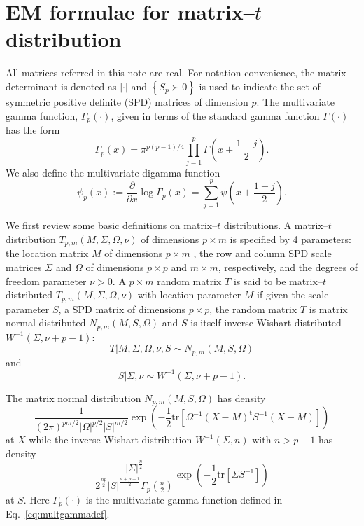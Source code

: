 \documentclass[english,listof=totoc]{scrartcl}
\begin{document}
\section{EM formulae for matrix--$t$ distribution}\label{sec:derivation}

All matrices referred in this note are real. For notation convenience, the matrix determinant is denoted as $|\cdot|$ and $\left\{S_p\succ 0\right\}$ is used to indicate the set of symmetric positive definite (SPD) matrices of dimension $p$. The multivariate gamma
function, $\Gamma_{p}(\cdot)$, given in terms of the standard gamma function $\Gamma(\cdot)$ has the form
\begin{equation}
\Gamma_{p}(x)=\pi^{p(p-1)/4}\prod_{j=1}^{p}\Gamma\left(x+\frac{1-j}{2}\right).\label{eq:multgammadef}
\end{equation}
We also define the multivariate digamma function
%
\begin{equation}
\psi_{p}(x):=\frac{\partial}{\partial x}\log\Gamma_{p}(x)=\sum_{j=1}^{p}\psi\left(x+\frac{1-j}{2}\right).
\end{equation}

We first review some basic definitions on matrix--$t$ distributions. A matrix--$t$ distribution $T_{p,m}(M,\Sigma,\Omega,\nu)$ of dimensions $p\times m$ is specified by 4 parameters: the location matrix $M$ of dimensions $p\times m$ , the row and column SPD scale matrices $\Sigma$ and $\Omega$ of dimensions $p\times p$ and $m\times m$, respectively, and the degrees of freedom parameter $\nu>0$. A $p \times m$ random matrix $T$ is said to be matrix--$t$ distributed $T_{p,m}(M,\Sigma,\Omega,\nu)$ with location parameter $M$ if given the scale parameter $S$, a SPD matrix of dimensions $p\times p$, the random matrix $T$ is matrix normal distributed $N_{p,m}(M,S,\Omega)$ and $S$ is itself inverse Wishart distributed $W^{-1}(\Sigma,\nu +p -1)$:
\begin{equation}
T|M,\Sigma,\Omega,\nu,S \sim N_{p,m}(M,S,\Omega)\label{eq:tdef1}
\end{equation}
and
\begin{equation}
S|\Sigma,\nu \sim W^{-1}(\Sigma,\nu+p-1).\label{eq:tdef2}
\end{equation}

The matrix normal distribution $N_{p,m}(M,S,\Omega)$ has density
\begin{equation}
\frac{1}{(2\pi)^{pm/2}|\Omega|^{p/2}|S|^{m/2}}\exp\left(-\frac{1}{2}\textrm{tr}\left[\Omega^{-1}(X-M)^{\textrm{t}}S^{-1}(X-M)\right]\right)\label{eq:ndistpdf}
\end{equation}
at $X$ while the inverse Wishart distribution $W^{-1}(\Sigma,n)$ with $n>p-1$ has density
\begin{equation}
\frac{|\Sigma|^{\frac{n}{2}}}{2^{\frac{n p}{2}}|S|^{\frac{n+p+1}{2}}\Gamma_{p}(\frac{n}{2})}\exp\left(-\frac{1}{2}\textrm{tr}\left[\Sigma S^{-1}\right]\right)\label{eq:wdistpdf}
\end{equation}
at $S$. Here $\Gamma_{p}(\cdot)$ is the
multivariate gamma function defined in Eq.~\eqref{eq:multgammadef}.
\end{document}
